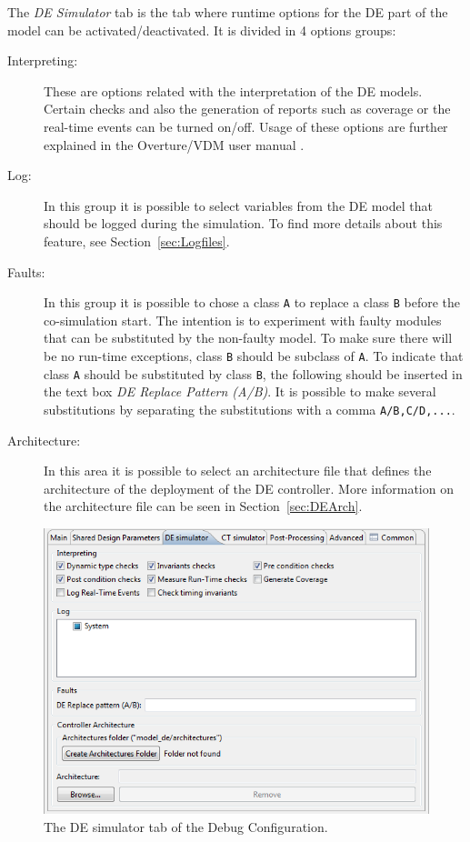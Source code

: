 \documentclass{crescendorepchap}
\begin{document}
The \emph{DE Simulator} tab is the tab where runtime options for the DE part of
the model can be activated/deactivated. It is divided in 4 options
groups:

\begin{description}
\item[Interpreting:] These are options related with the interpretation of
  the DE models. Certain checks and also the generation of reports such
  as coverage or the real-time events can be turned on/off. Usage of these
  options are further explained in the Overture/VDM user manual \cite{Larsen&13a}.
\item[Log:] In this group it is possible to select variables from the DE
  model that should be logged during the simulation. To find more
  details about this feature, see Section~\ref{sec:Logfiles}.
\item[Faults:] In this group it is possible to
  chose a class \texttt{A} to replace a class \texttt{B} before the co-simulation start. The
  intention is to experiment with faulty modules that can be substituted
  by the non-faulty model. To make sure there will be no run-time
  exceptions, class \texttt{B} should be subclass of \texttt{A}. To indicate that class \texttt{A}
  should be substituted by class \texttt{B}, the following should be inserted in
  the text box \emph{DE Replace Pattern (A/B)}. It is possible to make several
  substitutions by separating the substitutions with a comma
  \texttt{A/B,C/D,...}.
\item[Architecture:] In this area it is
  possible to select an architecture file that defines the architecture
  of the deployment of the DE controller. More information on the
  architecture file can be seen in Section~\ref{sec:DEArch}.
\end{description}

\begin{figure}[htbp]
\centering
\includegraphics[width=.6\textwidth]{images/DestecsDebugConfigurationDESimulator.png}
\caption{The DE simulator tab of the Debug Configuration.}
\end{figure}
\end{document}

